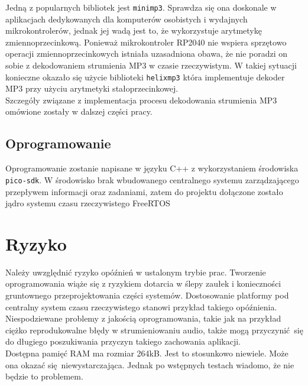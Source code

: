 \documentclass[polish]{aghengthesis}
\begin{document}
			Jedną z popularnych bibliotek jest \lstinline|minimp3|\textsuperscript{\cite{minimp3}}. Sprawdza się ona doskonale w aplikacjach dedykowanych dla komputerów osobistych i wydajnych mikrokontrolerów, jednak jej wadą jest to, że wykorzystuje arytmetykę zmiennoprzecinkową. Ponieważ mikrokontroler RP2040 nie wspiera sprzętowo operacji zmiennoprzecinkowych istniała uzasadniona obawa, że nie poradzi on sobie z dekodowaniem strumienia MP3 w czasie rzeczywistym. W takiej sytuacji konieczne okazało się użycie  biblioteki \lstinline|helixmp3|\textsuperscript{\cite{helixmp3_repo}} która implementuje dekoder MP3 przy użyciu arytmetyki stałoprzecinkowej.
			$ $\\
			
			Szczegóły związane z implementacja procesu dekodowania strumienia MP3 omówione zostały w dalszej części pracy.
		
		\subsection{Oprogramowanie}
			Oprogramowanie zostanie napisane w języku C++ z wykorzystaniem środowiska \lstinline|pico-sdk|\textsuperscript{\cite{pico_sdk}}.  W środowisko brak wbudowanego centralnego systemu zarządzającego przepływem informacji oraz zadaniami, zatem do projektu dołączone zostało jądro systemu czasu rzeczywistego FreeRTOS\textsuperscript{\cite{freertos_kernel}}
	
	\section{Ryzyko}
		Należy uwzględnić ryzyko opóźnień w ustalonym trybie prac. Tworzenie oprogramowania wiąże się z ryzykiem dotarcia w ślepy zaułek i konieczności gruntownego przeprojektowania części systemów. Dostosowanie platformy pod centralny system czasu rzeczywistego stanowi przykład takiego opóźnienia.
		$ $\\
		
		Niespodziewane problemy z jakością oprogramowania, takie jak na przykład ciężko reprodukowalne błędy w strumieniowaniu audio, także mogą przyczynić się do długiego poszukiwania przyczyn takiego zachowania aplikacji.
		$ $\\
		
		Dostępna pamięć RAM ma rozmiar 264kB. Jest to stosunkowo niewiele. Może ona okazać się niewystarczająca. Jednak po wstępnych testach wiadomo, że nie będzie to problemem.
		$ $\\
		
\end{document}
